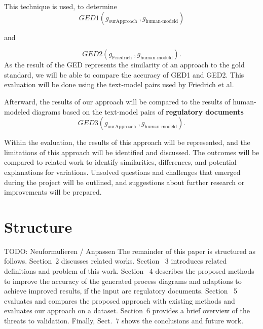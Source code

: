 This technique is used, to determine  
\begin{equation}
GED1\left(g_{\text {ourApproach }}, g_{\text {human-modeld}}\right)
\end{equation}

and

\begin{equation}
GED2\left(g_{\text {Friedrich }}, g_{\text {human-modeld}}\right).
\end{equation}
As the result of the GED represents the similarity of an approach to the gold standard, we will be able to compare the accuracy of GED1 and GED2. This evaluation will be done using the text-model pairs used by Friedrich et al. 

Afterward, the results of our approach will be compared to the results of human-modeled diagrams based on the text-model pairs of \textbf{regulatory documents} 
\begin{equation}
GED3\left(g_{\text {ourApproach }}, g_{\text {human-modeld}}\right).
\end{equation}

Within the evaluation, the results of this approach will be represented, and the limitations of this approach will be identified and discussed. The outcomes will be compared to related work to identify similarities, differences, and potential explanations for variations. Unsolved questions and challenges that emerged during the project will be outlined, and suggestions about further research or improvements will be prepared.
\pagebreak

\section{Structure}
\label{sec:intro:struct}
TODO: Neuformulieren / Anpassen
The remainder of this paper is structured as follows. Section 2 discusses related works. Section  3 introduces related definitions and problem of this work. Section  4 describes the proposed methods to improve the accuracy of the generated process diagrams and adaptions to achieve improved results, if the input are regulatory documents. Section  5 evaluates and compares the proposed approach with existing methods and evaluates our approach on a dataset. Section 6 provides a brief overview of the threats to validation. Finally, Sect. 7 shows the conclusions and future work.

\pagebreak

